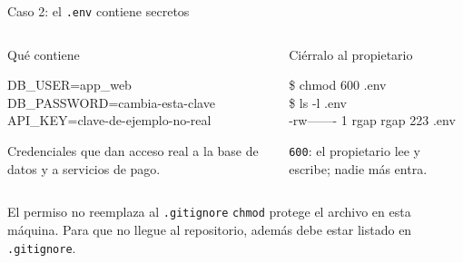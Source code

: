\documentclass[aspectratio=169,10pt,c]{beamer}
\begin{document}
\begin{frame}{Caso 2: el \texttt{.env} contiene secretos}
\begin{columns}[T,onlytextwidth]
\begin{exampleblock}{Qué contiene}
\begin{terminal}\footnotesize
DB\_USER=app\_web\\
DB\_PASSWORD=cambia-esta-clave\\
API\_KEY=clave-de-ejemplo-no-real
\end{terminal}
\small Credenciales que dan acceso real a la base de datos y a servicios de pago.
\end{exampleblock}
\begin{exampleblock}{Ciérralo al propietario}
\begin{terminal}\footnotesize
\$ chmod 600 .env\\
\$ ls -l .env\\
-rw------- 1 rgap rgap 223 .env
\end{terminal}
\small \texttt{600}: el propietario lee y escribe; nadie más entra.
\end{exampleblock}
\end{columns}
\begin{block}{El permiso no reemplaza al \texttt{.gitignore}}
\small \texttt{chmod} protege el archivo en esta máquina. Para que no llegue al repositorio, además debe estar listado en \texttt{.gitignore}.
\end{block}
\end{frame}
\end{document}
